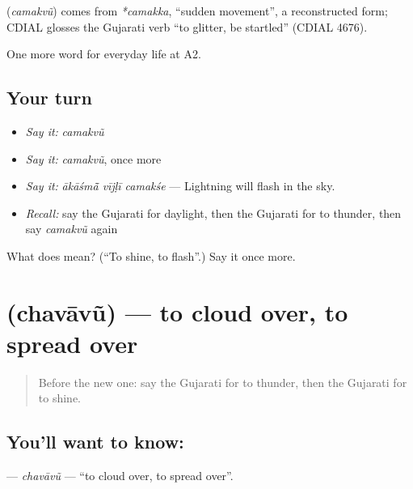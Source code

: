 \begin{cousinweb}
\textbf{} (\emph{camakvũ}) comes from \emph{*camakka}, \textquotedblleft{}sudden movement\textquotedblright{}, a reconstructed form; CDIAL glosses the Gujarati verb \textquotedblleft{}to glitter, be startled\textquotedblright{} (CDIAL 4676).
\end{cousinweb}

\begin{grammarlens}[title={What you've built}]
One more word for everyday life at A2.
\end{grammarlens}

\subsection*{Your turn}
\begin{itemize}
\raggedright
  \item \emph{Say it:} \emph{camakvũ}
  \item \emph{Say it:} \emph{camakvũ}, once more
  \item \emph{Say it:} \emph{ākāśmā̃ vījḷī camakśe} — Lightning will flash in the sky.
  \item \emph{Recall:} say the Gujarati for daylight, then the Gujarati for to thunder, then say \emph{camakvũ} again
\end{itemize}

\begin{tcolorbox}[breakable,colback=teal!4,colframe=teal!35!black,title={Before you move on}]
What does  mean? (\textquotedblleft{}To shine, to flash\textquotedblright{}.) Say it once more.
\end{tcolorbox}
\section[\texorpdfstring{\gu{છવાવું} (chavāvũ)}{છવાવું (chavāvũ)}]{ (chavāvũ) — to cloud over, to spread over}

\label{lesson:GU-C219-chavavu}



\begin{quote}
Before the new one: say the Gujarati for to thunder, then the Gujarati for to shine.
\end{quote}

\subsection*{You'll want to know: }
\textbf{} — \emph{chavāvũ} — \textquotedblleft{}to cloud over, to spread over\textquotedblright{}.

